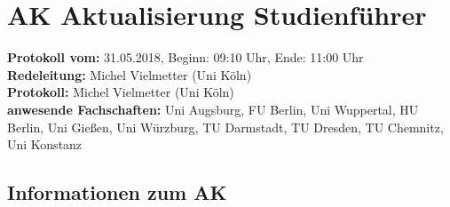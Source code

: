 
\section{AK Aktualisierung Studienführer}

	\textbf{Protokoll vom:} 31.05.2018,
	Beginn: 09:10 Uhr,
	Ende: 11:00 Uhr \\
	\textbf{Redeleitung:} Michel Vielmetter (Uni Köln) \\
	\textbf{Protokoll:} Michel Vielmetter (Uni Köln) \\
	\textbf{anwesende Fachschaften:} Uni Augsburg, FU Berlin, Uni Wuppertal, HU Berlin, Uni Gießen, Uni Würzburg, TU Darmstadt, TU Dresden, TU Chemnitz, Uni Konstanz

	\subsection*{Informationen zum AK}
		\begin{itemize}
		\end{itemize}

